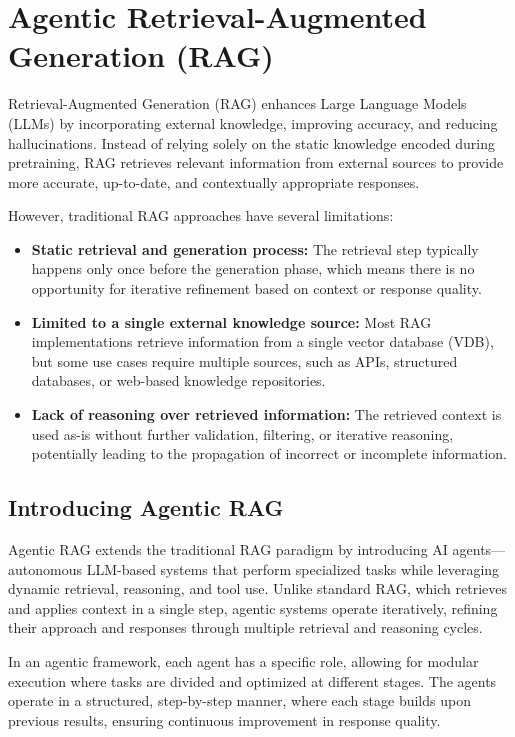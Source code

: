 \section{Agentic Retrieval-Augmented Generation (RAG)}

Retrieval-Augmented Generation (RAG) enhances Large Language Models (LLMs) by incorporating external knowledge, improving accuracy, and reducing hallucinations. Instead of relying solely on the static knowledge encoded during pretraining, RAG retrieves relevant information from external sources to provide more accurate, up-to-date, and contextually appropriate responses. 

However, traditional RAG approaches have several limitations:

\begin{itemize}
    \item \textbf{Static retrieval and generation process:} The retrieval step typically happens only once before the generation phase, which means there is no opportunity for iterative refinement based on context or response quality.
    \item \textbf{Limited to a single external knowledge source:} Most RAG implementations retrieve information from a single vector database (VDB), but some use cases require multiple sources, such as APIs, structured databases, or web-based knowledge repositories.
    \item \textbf{Lack of reasoning over retrieved information:} The retrieved context is used as-is without further validation, filtering, or iterative reasoning, potentially leading to the propagation of incorrect or incomplete information.
\end{itemize}

\subsection{Introducing Agentic RAG}
Agentic RAG extends the traditional RAG paradigm by introducing AI agents—autonomous LLM-based systems that perform specialized tasks while leveraging dynamic retrieval, reasoning, and tool use. Unlike standard RAG, which retrieves and applies context in a single step, agentic systems operate iteratively, refining their approach and responses through multiple retrieval and reasoning cycles.

In an agentic framework, each agent has a specific role, allowing for modular execution where tasks are divided and optimized at different stages. The agents operate in a structured, step-by-step manner, where each stage builds upon previous results, ensuring continuous improvement in response quality.

